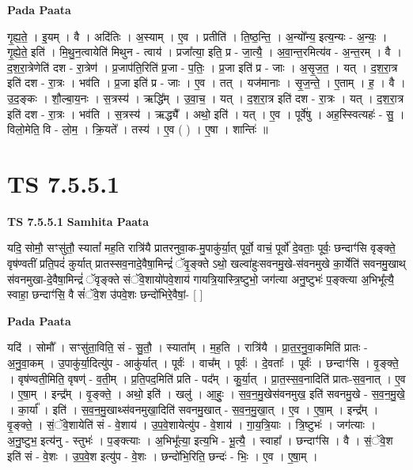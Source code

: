 \documentclass[17pt]{extarticle}
\begin{document}
\textbf{Pada Paata} \newline

गृ॒ह्य॒ते॒ । इ॒यम् । वै । अदि॑तिः । अ॒स्याम् । ए॒व । प्रतीति॑ । ति॒ष्ठ॒न्ति॒ । अ॒न्यो᳚न्य॒ इत्य॒न्यः - अ॒न्यः॒ । गृ॒ह्ये॒ते॒ इति॑ । मि॒थु॒न॒त्वायेति॑ मिथुन - त्वाय॑ । प्रजा᳚त्या॒ इति॒ प्र - जा॒त्यै॒ । अ॒वा॒न्त॒रमित्य॑व - अ॒न्त॒रम् । वै । द॒श॒रा॒त्रेणेति॑ दश - रा॒त्रेण॑ । प्र॒जाप॑ति॒रिति॑ प्र॒जा - प॒तिः॒ । प्र॒जा इति॑ प्र - जाः । अ॒सृ॒ज॒त॒ । यत् । द॒श॒रा॒त्र इति॑ दश - रा॒त्रः । भव॑ति । प्र॒जा इति॑ प्र - जाः । ए॒व । तत् । यज॑मानाः । सृ॒ज॒न्ते॒ । ए॒ताम् । ह॒ । वै । उ॒द॒ङ्कः । शौ॒ल्बा॒य॒नः । स॒त्रस्य॑ । ऋद्धि᳚म् । उ॒वा॒च॒ । यत् । द॒श॒रा॒त्र इति॑ दश - रा॒त्रः । यत् । द॒श॒रा॒त्र इति॑ दश - रा॒त्रः । भव॑ति । स॒त्रस्य॑ । ऋद्ध्यै᳚ । अथो॒ इति॑ । यत् । ए॒व । पूर्वे॑षु । अह॒स्स्वित्यहः॑ - सु॒ । विलो॒मेति॒ वि - लो॒म॒ । क्रि॒यते᳚ । तस्य॑ । ए॒व ( ) । ए॒षा । शान्तिः॑ ॥  \newline





\section{ TS 7.5.5.1 }

\textbf{TS 7.5.5.1 } \newline
\textbf{Samhita Paata} \newline

यदि॒ सोमौ॒ सꣳसु॑तौ॒ स्यातां᳚ मह॒ति रात्रि॑यै प्रातरनुवा॒क-मु॒पाकु॑र्या॒त् पूर्वो॒ वाचं॒ पूर्वो॑ दे॒वताः॒ पूर्वः॒ छन्दाꣳ॑सि वृङ्क्ते॒ वृष॑ण्वतीं प्रति॒पदं॑ कुर्यात् प्रातस्सव॒नादे॒वैषा॒मिन्द्रं॑ ॅवृ॒ङ्क्ते ऽथो॒ खल्वा॑हुःसवनमु॒खे-स॑वनमुखे का॒र्येति॑ सवनमु॒खाथ् स॑वनमुखा-दे॒वैषा॒मिन्द्रं॑ ॅवृङ्क्ते संॅवे॒शायो॑पवे॒शाय॑ गायत्रि॒यास्त्रि॒ष्टुभो॒ जग॑त्या अनु॒ष्टुभः॑ प॒ङ्क्त्या अ॒भिभू᳚त्यै॒ स्वाहा॒ छन्दाꣳ॑सि॒ वै सं॑ॅवे॒श उ॑पवे॒शः छन्दो॑भिरे॒वैषां॒- [  ] \newline

\textbf{Pada Paata} \newline

यदि॑ । सोमौ᳚ । सꣳसु॑ता॒विति॒ सं - सु॒तौ॒ । स्याता᳚म् । म॒ह॒ति । रात्रि॑यै । प्रा॒त॒र॒नु॒वा॒कमिति॑ प्रातः - अ॒नु॒वा॒कम् । उ॒पाकु॑र्या॒दित्यु॑प - आकु॑र्यात् । पूर्वः॑ । वाच᳚म् । पूर्वः॑ । दे॒वताः᳚ । पूर्वः॑ । छन्दाꣳ॑सि । वृ॒ङ्क्ते॒ । वृष॑ण्वती॒मिति॒ वृषण्॑ - व॒ती॒म् । प्र॒ति॒पद॒मिति॑ प्रति - पद᳚म् । कु॒र्या॒त् । प्रा॒त॒स्स॒व॒नादिति॑ प्रातः-स॒व॒नात् । ए॒व । ए॒षा॒म् । इन्द्र᳚म् । वृ॒ङ्क्ते॒ । अथो॒ इति॑ । खलु॑ । आ॒हुः॒ । स॒व॒न॒मु॒खेस॑वनमुख॒ इति॑ सवनमु॒खे - स॒व॒न॒मु॒खे॒ । का॒र्या᳚ । इति॑ । स॒व॒न॒मु॒खाथ्स॑वनमुखा॒दिति॑ सवनमु॒खात् - स॒व॒न॒मु॒खा॒त् । ए॒व । ए॒षा॒म् । इन्द्र᳚म् । वृ॒ङ्क्ते॒ । सं॒ॅवे॒शायेति॑ सं - वे॒शाय॑ । उ॒प॒वे॒शायेत्यु॑प - वे॒शाय॑ । गा॒य॒त्रि॒याः । त्रि॒ष्टुभः॑ । जग॑त्याः । अ॒नु॒ष्टुभ॒ इत्य॑नु - स्तुभः॑ । प॒ङ्क्त्याः । अ॒भिभू᳚त्या॒ इत्य॒भि - भू॒त्यै॒ । स्वाहा᳚ । छन्दाꣳ॑सि । वै । सं॒ॅवे॒श इति॑ सं - वे॒शः । उ॒प॒वे॒श इत्यु॑प - वे॒शः । छन्दो॑भि॒रिति॒ छन्दः॑ - भिः॒ । ए॒व । ए॒षा॒म् ।  \newline
\end{document}
